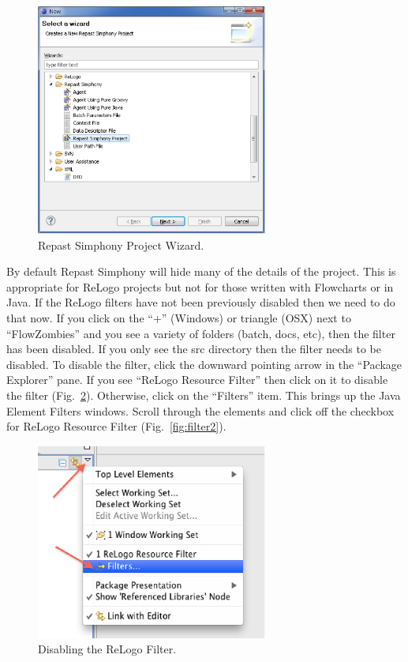 \documentclass[11pt]{amsart}
\begin{document}
\begin{figure}[h]
\begin{center}
\vspace{.2in}
\centerline {
\includegraphics[width=3in]{figs/new_wizard.eps}
}
\caption{Repast Simphony Project Wizard.}
\label{fig:newprojecticon}
\end{center}
\end{figure}

By default Repast Simphony will hide many of the details of the project. This is appropriate for ReLogo projects but not for those written with Flowcharts or in Java. If the ReLogo filters have not been previously disabled then we need to do that now. If you click on the ``+'' (Windows) or triangle (OSX) next to ``FlowZombies'' and you see a variety of folders (batch, docs, etc), then the filter has been disabled. If you only see the src directory then the filter needs to be disabled. To disable the filter, click the downward pointing arrow in the ``Package Explorer'' pane. If you see ``ReLogo Resource Filter''  then click on it to disable the filter (Fig.~\ref{fig:filter}).  Otherwise, click on the ``Filters'' item. This brings up the Java Element Filters windows. Scroll through the elements and click off the checkbox for ReLogo Resource Filter (Fig.~\ref{fig:filter2}). 

\begin{figure}[h]
\begin{center}
\vspace{.2in}
\centerline {
\includegraphics[width=3in]{figs/filter.eps}
}
\caption{Disabling the ReLogo Filter.}
\label{fig:filter}
\end{center}
\end{figure}
\end{document}
